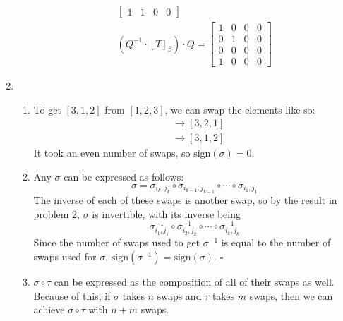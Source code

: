 \documentclass[12pt]{article}
\begin{document}
\begin{enumerate}
\begin{enumerate}
\begin{gather*}
\begin{bmatrix}
                                    1 & 1 & 0 & 0
                              \end{bmatrix} \\
                              \left(Q^{-1} \cdot [T]_\beta\right) \cdot Q = \begin{bmatrix}
                                    1 & 0 & 0 & 0 \\
                                    0 & 1 & 0 & 0 \\
                                    0 & 0 & 0 & 0 \\
                                    1 & 0 & 0 & 0
                              \end{bmatrix}
                        \end{gather*}
            \end{enumerate}
      \item \begin{enumerate}
                  \item To get $[3, 1, 2]$ from $[1, 2, 3]$, we can swap the elements like so:
                        \begin{align*}
                              [1, 2, 3] & \rightarrow [3, 2, 1] \\
                                        & \rightarrow [3, 1, 2]
                        \end{align*}
                        It took an even number of swaps, so $\text{sign}(\sigma)=\boxed{0}$.
                  \item Any $\sigma$ can be expressed as follows:
                        \[\sigma = \sigma_{i_k, j_k} \circ \sigma_{i_{k-1}, j_{k-1}} \circ \cdots \circ \sigma_{i_1, j_1}\]
                        The inverse of each of these swaps is another swap, so by the result in problem 2,
                        $\sigma$ is invertible, with its inverse being
                        \[\sigma_{i_1, j_1}^{-1} \circ \sigma_{i_2, j_2}^{-1} \circ \cdots \circ \sigma_{i_k, j_k}^{-1}\]
                        Since the number of swaps used to get $\sigma^{-1}$ is equal to the number of swaps used for $\sigma$,
                        $\text{sign}\left(\sigma^{-1}\right)=\text{sign}(\sigma)$. $\square$
                  \item $\sigma \circ \tau$ can be expressed as the composition of all of their swaps as well.
                        Because of this, if $\sigma$ takes $n$ swaps and $\tau$ takes $m$ swaps, then we
                        can achieve $\sigma \circ \tau$ with $n+m$ swaps.


\end{enumerate}
\end{enumerate}
\end{document}
